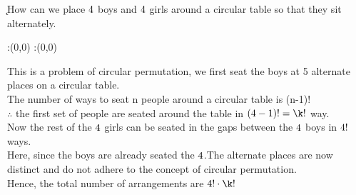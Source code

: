 


\SUBTRACT{}\k
\question How can we place $4$ boys and $4$ girls around a circular table so that they sit alternately.  


\watchout

\ifprintanswers
  \begin{marginfigure}
      :(0,0)
      :(0,0)
    \figdrawbegin{}
      \figdrawline [100,101]
    \figdrawend
    \figvisu{\figBoxA}{}{%
    }
    \centerline{\box\figBoxA}
  \end{marginfigure}
\fi 

\begin{solution}	
This is a problem of circular permutation, we first seat the boys at 5 alternate places on a circular table. \\
The number of ways to seat n people around a circular table is (n-1)!\\ 
$\therefore$ the first set of people are seated around the table in $(\vbone -1)! = \k!$ way.\\
Now the rest of the $4$ girls can be seated in the gaps between the $4$ boys in $4!$ ways. \\
Here, since the boys are already seated the $4$.The alternate places are now distinct and do not adhere to the concept of circular permutation.\\
Hence, the total number of arrangements are $\vbone! \cdot \k!$   
\end{solution}

